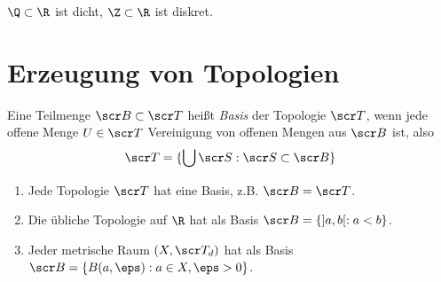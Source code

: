 \begin{ex}
	$\Q \subset \R$ ist dicht, $\Z \subset \R$ ist diskret.
\end{ex}


\section{Erzeugung von Topologien}


\begin{df}
	Eine Teilmenge $\scr B \subset \scr T$ heißt \emph{Basis} der Topologie $\scr T$, wenn jede offene Menge $U \in \scr T$ Vereinigung von offenen Mengen aus $\scr B$ ist, also
	\[
		\scr T = \{ \bigcup \scr S : \scr S \subset \scr B \}
	\]
\end{df}

\begin{ex}
	\begin{enumerate}[1)]
		\item
			Jede Topologie $\scr T$ hat eine Basis, z.B. $\scr B = \scr T$.
		\item
			Die übliche Topologie auf $\R$ hat als Basis $\scr B = \{ ]a,b[ : a < b \}$.
		\item
			Jeder metrische Raum $(X, \scr T_d)$ hat als Basis $\scr B = \{ B(a, \eps) : a \in X, \eps > 0\}$.
	\end{enumerate}
\end{ex}

